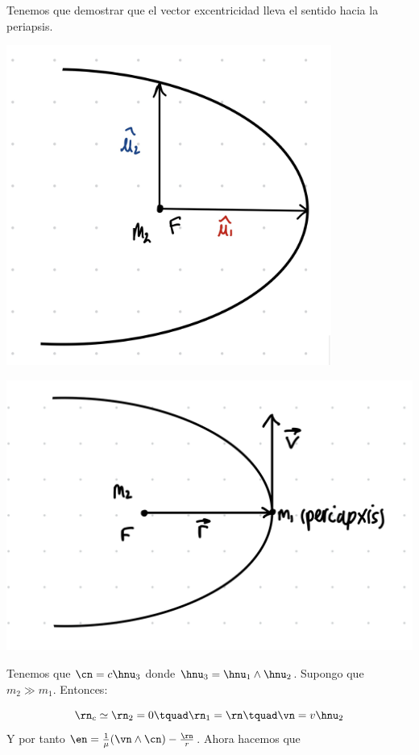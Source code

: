 	Tenemos que demostrar que el vector excentricidad lleva el sentido hacia la periapsis.


	\begin{minipage}{.45\textwidth}
		\includegraphics[width=0.8\textwidth]{Cuerpo/Imagenes/02_Ejercicio_1_1.jpg}
	\end{minipage}	\hfill
	\begin{minipage}{0.45\textwidth}
		\includegraphics[width=1.0\textwidth]{Cuerpo/Imagenes/02_Ejercicio_1_2.png}
	\end{minipage}

	Tenemos que $\cn=c\hnu_3$ donde $\hnu_3=\hnu_1\wedge\hnu_2$. Supongo que $m_2\gg m_1$. Entonces:

	\begin{equation}
		\rn_c \simeq \rn_2 = 0 \tquad \rn_1 = \rn \tquad \vn = v \hnu_2
	\end{equation}
	Y por tanto $\en=\frac{1}{\mu} (\vn \wedge \cn) - \frac{\rn}{r}$. Ahora hacemos que

